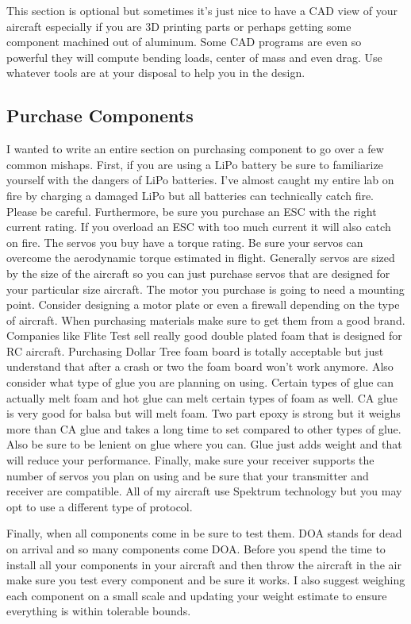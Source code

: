 This section is optional but sometimes it's just nice to have a CAD
view of your aircraft especially if you are 3D printing parts or
perhaps getting some component machined out of aluminum. Some CAD
programs are even so powerful they will compute bending loads, center
of mass and even drag. Use whatever tools are at your disposal to help
you in the design. 

\subsection{Purchase Components}

I wanted to write an entire section on purchasing component to go over
a few common mishaps. First, if you are using a LiPo battery be sure
to familiarize yourself with the dangers of LiPo batteries. I've
almost caught my entire lab on fire by charging a damaged LiPo but all
batteries can technically catch fire. Please be careful. Furthermore,
be sure you purchase an ESC with the right current rating. If you
overload an ESC with too much current it will also catch on fire. The
servos you buy have a torque rating. Be sure your servos can overcome
the aerodynamic torque estimated in flight. Generally servos are sized
by the size of the aircraft so you can just purchase servos that are
designed for your particular size aircraft. The motor you purchase is
going to need a mounting point. Consider designing a motor plate or
even a firewall depending on the type of aircraft. When purchasing
materials make sure to get them from a good brand. Companies like
Flite Test sell really good double plated foam that is designed for RC
aircraft. Purchasing Dollar Tree foam board is totally acceptable but
just understand that after a crash or two the foam board won't work
anymore. Also consider what type of glue you are planning on
using. Certain types of glue can actually melt foam and hot glue can
melt certain types of foam as well. CA glue is very good for balsa but
will melt foam. Two part epoxy is strong but it weighs more than CA
glue and takes a long time to set compared to other types of
glue. Also be sure to be lenient on glue where you can. Glue just adds
weight and that will reduce your performance. Finally, make sure your
receiver supports the number of servos you plan on using and be sure
that your transmitter and receiver are compatible. All of my aircraft
use Spektrum technology but you may opt to use a different type of
protocol.

Finally, when all components come in be sure to test them. DOA stands
for dead on arrival and so many components come DOA. Before you spend
the time to install all your components in your aircraft and then
throw the aircraft in the air make sure you test every component and
be sure it works. I also suggest weighing each component on a small
scale and updating your weight estimate to ensure everything is within
tolerable bounds. 


